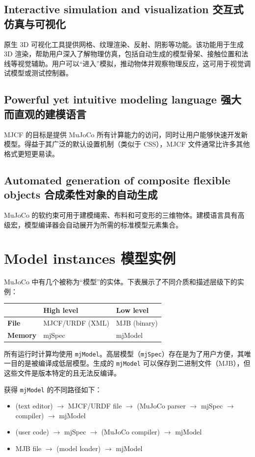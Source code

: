 \subsection{Interactive simulation and visualization 交互式仿真与可视化}
原生 3D 可视化工具提供网格、纹理渲染、反射、阴影等功能。该功能用于生成 3D 渲染，帮助用户深入了解物理仿真，包括自动生成的模型骨架、接触位置和法线等视觉辅助。用户可以“进入”模拟，推动物体并观察物理反应，这可用于视觉调试模型或测试控制器。

\subsection{Powerful yet intuitive modeling language 强大而直观的建模语言}
MJCF 的目标是提供 MuJoCo 所有计算能力的访问，同时让用户能够快速开发新模型。得益于其广泛的默认设置机制（类似于 CSS），MJCF 文件通常比许多其他格式更短更易读。

\subsection{Automated generation of composite flexible objects 合成柔性对象的自动生成}
MuJoCo 的软约束可用于建模绳索、布料和可变形的三维物体。建模语言具有高级宏，模型编译器会自动展开为所需的标准模型元素集合。

\section{Model instances 模型实例}
MuJoCo 中有几个被称为“模型”的实体。下表展示了不同介质和描述层级下的实例：

\begin{table}[h]
	\centering
	\begin{tabular}{|l|l|l|}
		\hline
		& \textbf{High level} & \textbf{Low level} \\ \hline
		\textbf{File}   & MJCF/URDF (XML)     & MJB (binary)       \\ \hline
		\textbf{Memory} & mjSpec              & mjModel            \\ \hline
	\end{tabular}
\end{table}

所有运行时计算均使用 \texttt{mjModel}。高层模型（\texttt{mjSpec}）存在是为了用户方便，其唯一目的是被编译成低层模型。生成的 \texttt{mjModel} 可以保存到二进制文件（MJB），但这些文件是版本特定的且无法反编译。

获得 \texttt{mjModel} 的不同路径如下：
\begin{itemize}
	\item (text editor) $\rightarrow$ MJCF/URDF file $\rightarrow$ (MuJoCo parser $\rightarrow$ mjSpec $\rightarrow$ compiler) $\rightarrow$ mjModel
	\item (user code) $\rightarrow$ mjSpec $\rightarrow$ (MuJoCo compiler) $\rightarrow$ mjModel
	\item MJB file $\rightarrow$ (model loader) $\rightarrow$ mjModel
\end{itemize}



